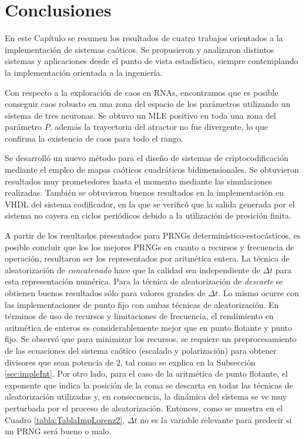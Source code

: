 \section{Conclusiones}

En este Capítulo se resumen los resultados de cuatro trabajos orientados a la implementación de sistemas caóticos.
Se propusieron y analizaron distintos sistemas y aplicaciones desde el punto de vista estadístico, siempre contemplando la implementación orientada a la ingeniería.

Con respecto a la exploración de caos en RNAs, encontramos que es posible conseguir caos robusto en una zona del espacio de los parámetros utilizando un sistema de tres neuronas.
Se obtuvo un MLE positivo en toda una zona del parámetro $P$, además la trayectoria del atractor no fue divergente, lo que confirma la existencia de caos para todo el rango.

Se desarrolló un nuevo método para el diseño de sistemas de criptocodificación mediante el empleo de mapas caóticos cuadráticos bidimensionales.
Se obtuvieron resultados muy prometedores hasta el momento mediante las simulaciones realizadas.
También se obtuvieron buenos resultados en la implementación en VHDL del sistema codificador, en la que se verificó que la salida generada por el sistema no cayera en ciclos periódicos debido a la utilización de presición finita.

A partir de los resultados presentados para PRNGs determinístico-estocásticos, es posible concluir que los los mejores PRNGs en cuanto a recursos y frecuencia de operación, resultaron ser los representados por aritmética entera.
La técnica de aleatorización de \textit{concatenado} hace que la calidad sea independiente de $\Delta t$ para esta representación numérica.
Para la técnica de aleatorización de \textit{descarte} se obtienen buenos resultados sólo para valores grandes de $\Delta t$.
Lo mismo ocurre con las implementaciones de punto fijo con ambas técnicas de aleatorización.
En términos de uso de recursos y limitaciones de frecuencia, el rendimiento en aritmética de enteros es considerablemente mejor que en punto flotante y punto fijo.
Se observó que para minimizar los recursos, se requiere un preprocesamiento de las ecuaciones del sistema caótico (escalado y polarización) para obtener divisores que sean potencia de $2$, tal como se explica en la Subsección \ref{sec:impleInt}.
Por otro lado, para el caso de la aritmética de punto flotante, el exponente que indica la posición de la coma se descarta en todas las técnicas de aleatorización utilizadas y, en consecuencia, la dinámica del sistema se ve muy perturbada por el proceso de aleatorización.
Entonces, como se muestra en el Cuadro \ref{tabla:TablaImpLorenz2}, $\Delta t $ no es la variable relevante para predecir si un PRNG será bueno o malo.

